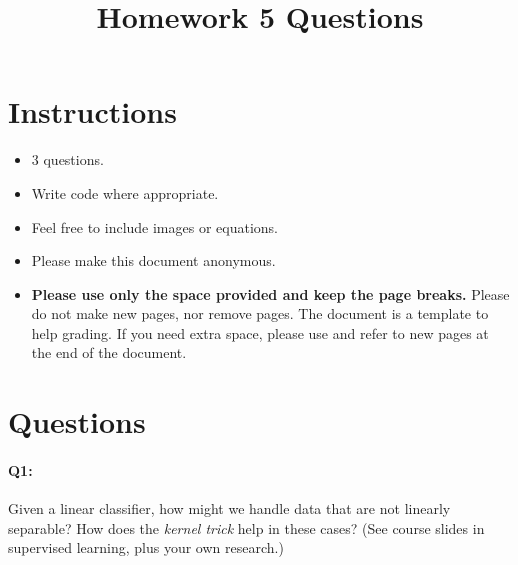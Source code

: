 \title{\vspace{-1.5cm}Homework 5 Questions}



\maketitle
\vspace{-3cm}
\thispagestyle{fancy}

\section*{Instructions}
\begin{itemize}
  \item 3 questions.
  \item Write code where appropriate.
  \item Feel free to include images or equations.
  \item Please make this document anonymous.
  \item \textbf{Please use only the space provided and keep the page breaks.} Please do not make new pages, nor remove pages. The document is a template to help grading. If you need extra space, please use and refer to new pages at the end of the document.
\end{itemize}

\section*{Questions}

\paragraph{Q1:} Given a linear classifier, how might we handle data that are not linearly separable? How does the \emph{kernel trick} help in these cases? (See course slides in supervised learning, plus your own research.)

